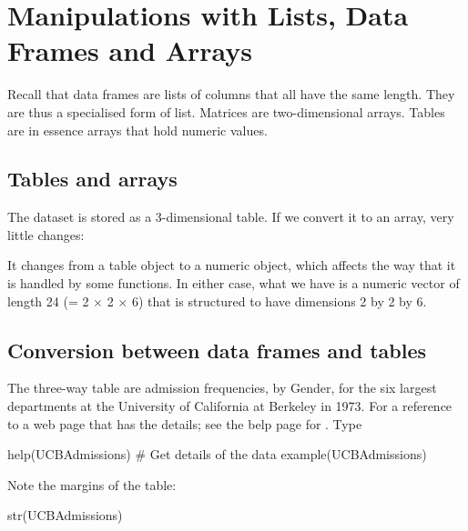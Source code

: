\section{Manipulations with Lists, Data Frames and Arrays}

Recall that data frames are lists of columns that all have the
same length.  They are thus a specialised form of list.  Matrices
are two-dimensional arrays.  Tables are in essence arrays that
hold numeric values.

\subsection{Tables and arrays}
The dataset  is stored as a 3-dimensional
table.  If we convert it to an array, very little changes:

It changes from a table object to a numeric object, which
affects the way that it is handled by some functions.  In
either case, what we have is a numeric vector of length 24
(= 2 $\times$ 2 $\times$ 6) that is structured to have
dimensions 2 by 2 by 6.

\subsection{Conversion between data frames and tables}
The three-way table  are admission frequencies,
by Gender, for the six largest departments at the University of
California at Berkeley in 1973. For a reference to a web page that
has the details; see the belp page for .  Type
\begin{Schunk}
\begin{Sinput}
help(UCBAdmissions)     # Get details of the data
example(UCBAdmissions)
\end{Sinput}
\end{Schunk}
Note the margins of the table:
\begin{fullwidth}
\begin{Schunk}
\begin{Sinput}
str(UCBAdmissions)
\end{Sinput}
\end{Schunk}
\end{fullwidth}


